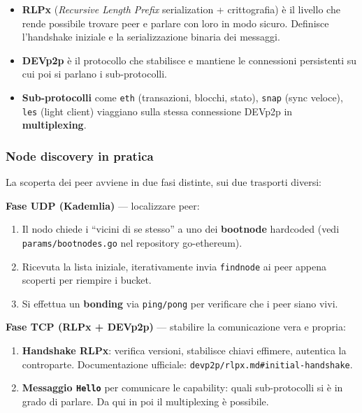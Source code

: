 \documentclass[
  italian,
  openany]{book}
\providecommand{\tightlist}{%
  \setlength{\itemsep}{0pt}\setlength{\parskip}{0pt}}
\begin{document}
\begin{itemize}
\tightlist
\item
  \textbf{RLPx} (\emph{Recursive Length Prefix} serialization +
  crittografia) è il livello che rende possibile trovare peer e parlare
  con loro in modo sicuro. Definisce l'handshake iniziale e la
  serializzazione binaria dei messaggi.
\item
  \textbf{DEVp2p} è il protocollo che stabilisce e mantiene le
  connessioni persistenti su cui poi si parlano i sub-protocolli.
\item
  \textbf{Sub-protocolli} come \texttt{eth} (transazioni, blocchi,
  stato), \texttt{snap} (sync veloce), \texttt{les} (light client)
  viaggiano sulla stessa connessione DEVp2p in \textbf{multiplexing}.
\end{itemize}

\subsubsection{Node discovery in
pratica}\label{node-discovery-in-pratica}

La scoperta dei peer avviene in due fasi distinte, sui due trasporti
diversi:

\textbf{Fase UDP (Kademlia)} --- localizzare peer:

\begin{enumerate}
\def\labelenumi{\arabic{enumi}.}
\tightlist
\item
  Il nodo chiede i ``vicini di se stesso'' a uno dei \textbf{bootnode}
  hardcoded (vedi \texttt{params/bootnodes.go} nel repository
  go-ethereum).
\item
  Ricevuta la lista iniziale, iterativamente invia \texttt{findnode} ai
  peer appena scoperti per riempire i bucket.
\item
  Si effettua un \textbf{bonding} via \texttt{ping/pong} per verificare
  che i peer siano vivi.
\end{enumerate}

\textbf{Fase TCP (RLPx + DEVp2p)} --- stabilire la comunicazione vera e
propria:

\begin{enumerate}
\def\labelenumi{\arabic{enumi}.}
\tightlist
\item
  \textbf{Handshake RLPx}: verifica versioni, stabilisce chiavi
  effimere, autentica la controparte. Documentazione ufficiale:
  \texttt{devp2p/rlpx.md\#initial-handshake}.
\item
  \textbf{Messaggio \texttt{Hello}} per comunicare le capability: quali
  sub-protocolli si è in grado di parlare. Da qui in poi il multiplexing
  è possibile.
\end{enumerate}
\end{document}
